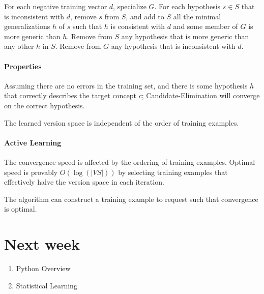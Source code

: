 \documentclass{idc_msc}
\begin{document}
For each negative training vector $d$, specialize $G$.
For each hypothesis $s \in S$ that is inconsistent with $d$, remove $s$ from $S$, and add to $S$ all the minimal generalizations $h$ of $s$ such that $h$ is consistent with $d$ and some member of $G$ is more generic than $h$.
Remove from $S$ any hypothesis that is more generic than any other $h$ in $S$.
Remove from $G$ any hypothesis that is inconsistent with $d$.

\paragraph{Properties}

Assuming there are no errors in the training set, and there is some hypothesis $h$ that correctly describes the target concept $c$;
Candidate-Elimination will converge on the correct hypothesis.

The learned version space is independent of the order of training examples.

\paragraph{Active Learning}

The convergence speed is affected by the ordering of training examples.
Optimal speed is provably $O(\log(|VS|))$ by selecting training examples that effectively halve the version space in each iteration.

The algorithm can construct a training example to request such that convergence is optimal.

\section{Next week}

\begin{enumerate}
  \item Python Overview
  \item Statistical Learning
\end{enumerate}
\end{document}
